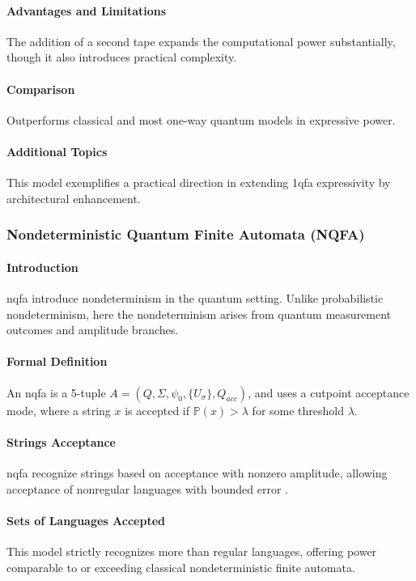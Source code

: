 \paragraph{Advantages and Limitations}
The addition of a second tape expands the computational power substantially, though it also introduces practical complexity.

\paragraph{Comparison}
Outperforms classical and most one-way quantum models in expressive power.

\paragraph{Additional Topics}
This model exemplifies a practical direction in extending \gls{1qfa} expressivity by architectural enhancement.

\subsubsection{Nondeterministic Quantum Finite Automata (NQFA)}
\paragraph{Introduction}
\gls{nqfa} introduce nondeterminism in the quantum setting. Unlike probabilistic nondeterminism, here the nondeterminism arises from quantum measurement outcomes and amplitude branches.

\paragraph{Formal Definition}
An \gls{nqfa} is a 5-tuple \( A = (Q, \Sigma, \psi_0, \{U_\sigma\}, Q_{acc}) \), and uses a cutpoint acceptance mode, where a string \( x \) is accepted if \( \mathbb{P}(x) > \lambda \) for some threshold \( \lambda \).

\paragraph{Strings Acceptance}
\gls{nqfa} recognize strings based on acceptance with nonzero amplitude, allowing acceptance of nonregular languages with bounded error \cite{yakaryilmaz2010languages}.

\paragraph{Sets of Languages Accepted}
This model strictly recognizes more than regular languages, offering power comparable to or exceeding classical nondeterministic finite automata.

